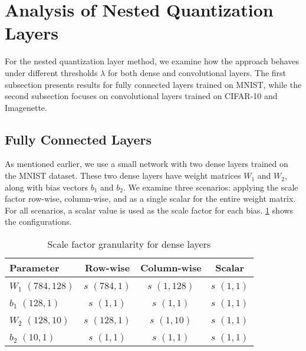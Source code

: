 
\section{Analysis of Nested Quantization Layers}
\label{sec:paretofronts}
\hspace*{1em}For the nested quantization layer method, 
we examine how the approach behaves under different thresholds 
 \( \lambda \)
for both dense and convolutional layers. The first subsection presents results for fully connected layers trained on MNIST,
while the second subsection focuses on convolutional layers trained on CIFAR-10 and Imagenette.

\subsection{Fully Connected Layers}
\label{subsec:paretofrontsdense}
\hspace*{1em}As mentioned earlier, we use a small network with two dense layers trained on the MNIST dataset. 
These two dense layers have weight matrices \( W_1 \) and \( W_2 \),
along with bias vectors \( b_1 \) and \( b_2 \).
We examine three scenarios:
applying the scale factor row-wise, 
column-wise, and as a single scalar for the entire weight matrix.
For all scenarios, a scalar value is used as the scale factor for each bias. 
\cref{tab:scalefactorgranularitydense} shows the configurations.

\begin{table}[b!]
  \centering
  \caption{Scale factor granularity for dense layers}
  \label{tab:scalefactorgranularitydense}
  \begin{tabular}{lccc}
    \toprule
    \textbf{Parameter}             & \textbf{Row-wise}       & \textbf{Column-wise}       & \textbf{Scalar}       \\ 
    \midrule
    \( W_1 \) \( (784, 128) \) & \( s \) \( (784, 1) \)        & \( s \) \( (1, 128) \)           & \( s \) \( (1, 1) \)         \\ 
    \( b_1 \) \( (128, 1) \)   & \( s \) \( (1, 1) \)          & \( s \) \( (1, 1) \)             & \( s \) \( (1, 1) \)         \\ 
    \( W_2 \) \( (128, 10) \)  & \( s \) \( (128, 1) \)        & \( s \) \( (1, 10) \)            & \( s \) \( (1, 1) \)         \\ 
    \( b_2 \) \( (10, 1) \)    & \( s \) \( (1, 1) \)          & \( s \) \( (1, 1) \)             & \( s \) \( (1, 1) \)         \\ 
    \bottomrule
  \end{tabular}
  \vspace{0.5em}
\end{table}


